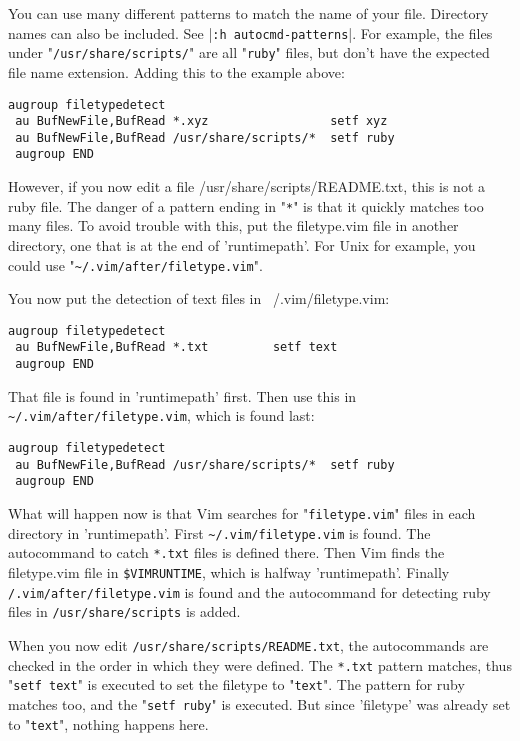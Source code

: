 You can use many different patterns to match the name of your file.
Directory names can also be included.
See |\verb!:h autocmd-patterns!|.
For example, the files under "\verb!/usr/share/scripts/!" are all "\verb!ruby!" files, but don't have the expected file name extension.
Adding this to the example above:

\begin{Verbatim}[samepage=true]
 augroup filetypedetect
 au BufNewFile,BufRead *.xyz                 setf xyz
 au BufNewFile,BufRead /usr/share/scripts/*  setf ruby
 augroup END
\end{Verbatim}

However, if you now edit a file /usr/share/scripts/README.txt, this is not a
ruby file.  The danger of a pattern ending in "\verb!*!" is that it quickly matches
too many files.  To avoid trouble with this, put the filetype.vim file in
another directory, one that is at the end of 'runtimepath'.  For Unix for
example, you could use "\verb!~/.vim/after/filetype.vim!".

You now put the detection of text files in ~/.vim/filetype.vim:

\begin{Verbatim}[samepage=true]
 augroup filetypedetect
 au BufNewFile,BufRead *.txt         setf text
 augroup END
\end{Verbatim}

That file is found in 'runtimepath' first.
Then use this in \verb!~/.vim/after/filetype.vim!, which is found last:

\begin{Verbatim}[samepage=true]
 augroup filetypedetect
 au BufNewFile,BufRead /usr/share/scripts/*  setf ruby
 augroup END
\end{Verbatim}

What will happen now is that Vim searches for "\verb!filetype.vim!" files in each directory in 'runtimepath'.
First \verb!~/.vim/filetype.vim! is found.
The autocommand to catch \verb!*.txt! files is defined there.
Then Vim finds the filetype.vim file in \verb!$VIMRUNTIME!, which is halfway 'runtimepath'.
Finally \verb!/.vim/after/filetype.vim! is found and the autocommand for detecting ruby files in \verb!/usr/share/scripts! is added.

When you now edit \verb!/usr/share/scripts/README.txt!, the autocommands are checked in the order in which they were defined.
The \verb!*.txt! pattern matches, thus "\verb!setf text!" is executed to set the filetype to "\verb!text!".
The pattern for ruby matches too, and the "\verb!setf ruby!" is executed.
But since 'filetype' was already set to "\verb!text!", nothing happens here.

